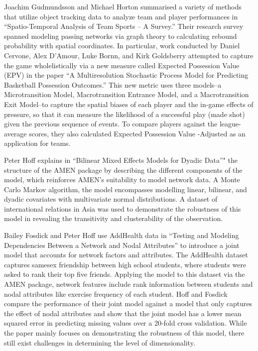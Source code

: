 \documentclass[12pt,twoside]{dukestatscithesis}
\theoremstyle{definition}
\theoremstyle{definition}
\theoremstyle{definition}
\theoremstyle{remark}
\begin{document}
Joachim Gudmundsson and Michael Horton summarised a variety of methods
that utilize object tracking data to analyze team and player
performances in ``Spatio-Temporal Analysis of Team Sports -- A Survey.''
Their research survey spanned modeling passing networks via graph theory
to calculating rebound probability with spatial coordinates. In
particular, work conducted by Daniel Cervone, Alex D'Amour, Luke Bornn,
and Kirk Goldsberry attempted to capture the game wholelistically via a
new measure called Expected Possession Value (EPV) in the paper ``A
Multiresolution Stochastic Process Model for Predicting Basketball
Possession Outcomes.'' This new metric uses three models--a
Microtransition Model, Macrotransition Entrance Model, and a
Macrotransition Exit Model--to capture the spatial biases of each player
and the in-game effects of pressure, so that it can measure the
likelihood of a successful play (made shot) given the previous sequence
of events. To compare players against the league-average scores, they
also calculated Expected Possession Value -Adjusted as an application
for teams.

Peter Hoff explains in ``Bilinear Mixed Effects Models for Dyadic
Data''" the structure of the AMEN package by describing the different
components of the model, which reinforces AMEN's suitability to model
network data. A Monte Carlo Markov algorithm, the model encompasses
modelling linear, bilinear, and dyadic covariates with multivariate
normal distributions. A dataset of international relations in Asia was
used to demonstrate the robustness of this model in revealing the
transitivity and clusterability of the observation.

Bailey Fosdick and Peter Hoff use AddHealth data in ``Testing and
Modeling Dependencies Between a Network and Nodal Attributes'' to
introduce a joint model that accounts for network factors and
attributes. The AddHealth dataset captures samesex friendship between
high school students, where students were asked to rank their top five
friends. Applying the model to this dataset via the AMEN package,
network features include rank information between students and nodal
attributes like exercise frequency of each student. Hoff and Fosdick
compare the performance of their joint model against a model that only
captures the effect of nodal attributes and show that the joint model
has a lower mean squared error in predicting missing values over a
20-fold cross validation. While the paper mainly focuses on
demonstrating the robustness of this model, there still exist challenges
in determining the level of dimensionality.
\end{document}
